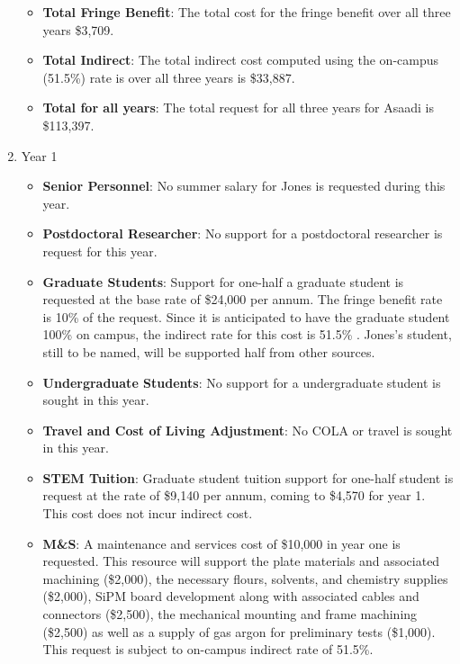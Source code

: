 \begin{enumerate}
\begin{itemize}[noitemsep,nolistsep]
\item {{\bf Total Fringe Benefit}: The total cost for the fringe benefit over all three years \$3,709.}

\item {{\bf Total Indirect}: The total indirect cost computed using the on-campus (51.5\%) rate is over all three years is \$33,887.}

\item {{\bf Total for all years}: The total request for all three years for Asaadi is \$113,397.}

\end{itemize}

\item{Year 1}

\begin{itemize}[noitemsep,nolistsep]

\item{{\bf Senior Personnel}: No summer salary for Jones is requested during this year.}

\item {{\bf Postdoctoral Researcher}: No support for a postdoctoral researcher is request for this year.} 

\item{{\bf Graduate Students}: Support for one-half a graduate student is requested at the base rate of \$24,000 per annum.   The fringe benefit rate is 10\% of the request.  Since it is anticipated to have the graduate student 100\% on campus, the indirect rate for this cost is 51.5\% .  Jones’s student, still to be named, will be supported half from other sources.}

\item {{\bf Undergraduate Students}: No support for a undergraduate student is sought in this year.}

\item{{\bf Travel and Cost of Living Adjustment}: No COLA or travel is sought in this year.}

\item {{\bf STEM Tuition}: Graduate student tuition support for one-half student is request at the rate of \$9,140 per annum, coming to \$4,570 for year 1.  This cost does not incur indirect cost.}

\item {{\bf M\&S}: A maintenance and services cost of \$10,000 in year one is requested. This resource will support the plate materials and associated machining (\$2,000), the necessary flours, solvents, and chemistry supplies (\$2,000), SiPM board development along with associated cables and connectors (\$2,500), the mechanical mounting and frame machining (\$2,500)  as well as a supply of gas argon for preliminary tests (\$1,000). This request is subject to on-campus indirect rate of 51.5\%.}


\end{itemize}
\end{enumerate}
